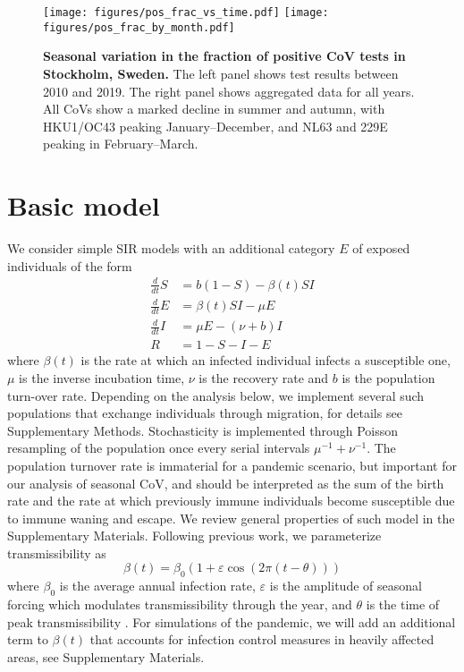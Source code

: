 \documentclass[rmp, reprint, superscriptaddress, floatfix,amsmath]{revtex4-1}
\newcommand{\Jan}[1]{{\color{deepsaffron}Jan: #1}}
\newcommand{\Emma}[1]{{\color{purple}Emma: #1}}
\newcommand{\forcing}{\varepsilon}
\begin{document}
\begin{figure*}
    \centering
    \texttt{[image: figures/pos\_frac\_vs\_time.pdf]}
    \texttt{[image: figures/pos\_frac\_by\_month.pdf]}
    \caption{{\bf Seasonal variation in the fraction of positive CoV tests in Stockholm, Sweden.} The left panel shows test results between 2010 and 2019. The right panel shows aggregated data for all years. All CoVs show a marked decline in summer and autumn, with HKU1/OC43 peaking January--December, and NL63 and 229E peaking in February--March. %
    }
    \label{fig:seasonal_CoV}
\end{figure*}

\section{Basic model}
We consider simple SIR models \citep{kermack_contributions_1991} with an additional category $E$ of exposed individuals of the form 
\begin{equation}
\begin{split}
\frac{d}{dt} S & = b(1-S) - \beta(t) S I \\
\frac{d}{dt} E & = \beta(t) S I - \mu E\\
\frac{d}{dt} I & = \mu E - (\nu+b) I \\
R & = 1-S-I-E
\end{split}
\label{eq:SIR}
\end{equation}
where $\beta(t)$ is the rate at which an infected individual infects a susceptible one, $\mu$ is the inverse incubation time, $\nu$ is the recovery rate and $b$ is the population turn-over rate. 
Depending on the analysis below, we implement several such populations that exchange individuals through migration, for details see Supplementary Methods. 
Stochasticity is implemented through Poisson resampling of the population once every serial intervals $\mu^{-1}+\nu^{-1}$.
The population turnover rate is immaterial for a pandemic scenario, but important for our analysis of seasonal CoV, and should be interpreted as the sum of the birth rate and the rate at which previously immune individuals become susceptible due to immune waning and escape.
We review general properties of such model in the Supplementary Materials. 
Following previous work, we parameterize transmissibility as 
\begin{equation}
\beta(t) = \beta_0\left(1+\forcing\cos(2\pi (t-\theta))\right)
\label{eq:transmissibility}
\end{equation}
where $\beta_0$ is the average annual infection rate, $\forcing$ is the amplitude of seasonal forcing which modulates transmissibility through the year, and $\theta$ is the time of peak transmissibility \citep{dushoff_dynamical_2004,chen_regular_2017}.
For simulations of the pandemic, we will add an additional term to $\beta(t)$ that accounts for infection control measures in heavily affected areas, see Supplementary Materials.
\end{document}
